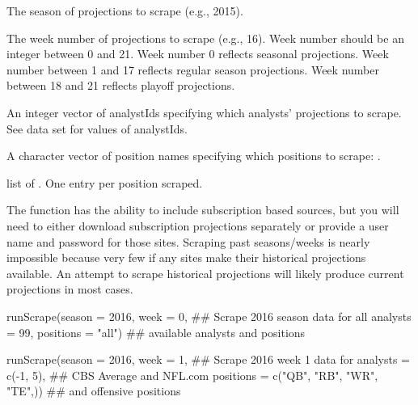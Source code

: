 \documentclass[a4paper]{book}
\begin{document}
\begin{Arguments}
\begin{ldescription}
\item[\code{season}] The season of projections to scrape (e.g., 2015).

\item[\code{week}] The week number of projections to scrape (e.g., 16).
Week number should be an integer between 0 and 21.
Week number 0 reflects seasonal projections.
Week number between 1 and 17 reflects regular season projections.
Week number between 18 and 21 reflects playoff projections.

\item[\code{analysts}] An integer vector of analystIds specifying which analysts' projections to
scrape. See  data set for values of analystIds.

\item[\code{positions}] A character vector of position names specifying which positions
to scrape: .
\end{ldescription}
\end{Arguments}
%
\begin{Value}
list of . One entry per position scraped.
\end{Value}
%
\begin{Note}\relax
The function has the ability to include subscription based sources,
but you will need to either download subscription projections separately or
provide a user name and password for those sites.
Scraping past seasons/weeks is nearly impossible because very few if any sites
make their historical projections available. An attempt to scrape historical
projections will likely produce current projections in most cases.
\end{Note}
%
\begin{Examples}
\begin{ExampleCode}
runScrape(season = 2016, week = 0,         ## Scrape 2016 season data for all
         analysts = 99, positions = "all") ## available analysts and positions

runScrape(season = 2016, week = 1,               ## Scrape 2016 week 1 data for
         analysts = c(-1, 5),                    ## CBS Average and NFL.com
         positions = c("QB", "RB", "WR", "TE",)) ## and offensive positions
\end{ExampleCode}
\end{Examples}
\end{document}
